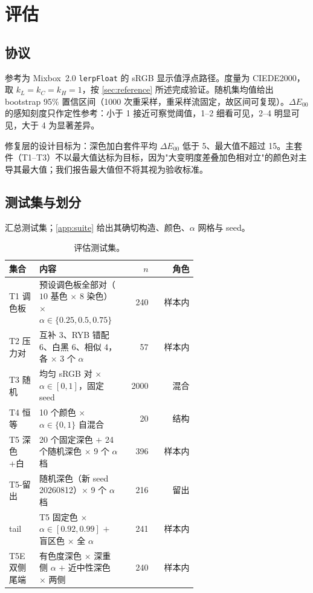 \section{评估}
\label{sec:evaluation}

\subsection{协议}
\label{sec:protocol}

参考为 Mixbox~2.0 \texttt{lerpFloat} 的 sRGB 显示值浮点路径。度量为 CIEDE2000，取 $k_{L}=k_{C}=k_{H}=1$，按 \cref{sec:reference} 所述完成验证。随机集均值给出 bootstrap 95\% 置信区间（1000 次重采样，重采样流固定，故区间可复现）。$\Delta E_{00}$ 的感知刻度只作定性参考：小于 1 接近可察觉阈值，1--2 细看可见，2--4 明显可见，大于 4 为显著差异。

修复层的设计目标为：深色加白套件平均 $\Delta E_{00}$ 低于 5、最大值不超过 15。主套件（T1--T3）不以最大值达标为目标，因为"大变明度差叠加色相对立"的颜色对主导其最大值；我们报告最大值但不将其视为验收标准。

\subsection{测试集与划分}
\label{sec:sets}

 汇总测试集；\cref{app:suite} 给出其确切构造、颜色、$\alpha$ 网格与 seed。

\begin{table}[t]
\centering
\footnotesize
\setlength{\tabcolsep}{3pt}
\caption{评估测试集。}
\label{tab:sets}
\begin{tabular}{p{0.16\linewidth}p{0.46\linewidth}rr}
\toprule
集合 & 内容 & $n$ & 角色 \\
\midrule
T1 调色板 & 预设调色板全部对（$10$ 基色 $\times$ $8$ 染色）$\times$ $\alpha\in\{0.25,0.5,0.75\}$ & 240 & 样本内 \\
T2 压力对 & 互补 3、RYB 错配 6、白黑 6、相似 4，各 $\times$ 3 个 $\alpha$ & 57 & 样本内 \\
T3 随机 & 均匀 sRGB 对 $\times$ $\alpha\in[0,1]$，固定 seed & 2000 & 混合 \\
T4 恒等 & 10 个颜色 $\times$ $\alpha\in\{0,1\}$ 自混合 & 20 & 结构 \\
T5 深色+白 & 20 个固定深色 $+$ 24 个随机深色 $\times$ 9 个 $\alpha$ 档 & 396 & 样本内 \\
T5-留出 & 随机深色（新 seed 20260812）$\times$ 9 个 $\alpha$ 档 & 216 & 留出 \\
tail & T5 固定色 $\times$ $\alpha\in[0.92,0.99]$ $+$ 盲区色 $\times$ 全 $\alpha$ & 241 & 样本内 \\
T5E 双侧尾端 & 有色度深色 $\times$ 深重侧 $\alpha$ $+$ 近中性深色 $\times$ 两侧 & 240 & 样本内 \\
\bottomrule
\end{tabular}
\end{table}

